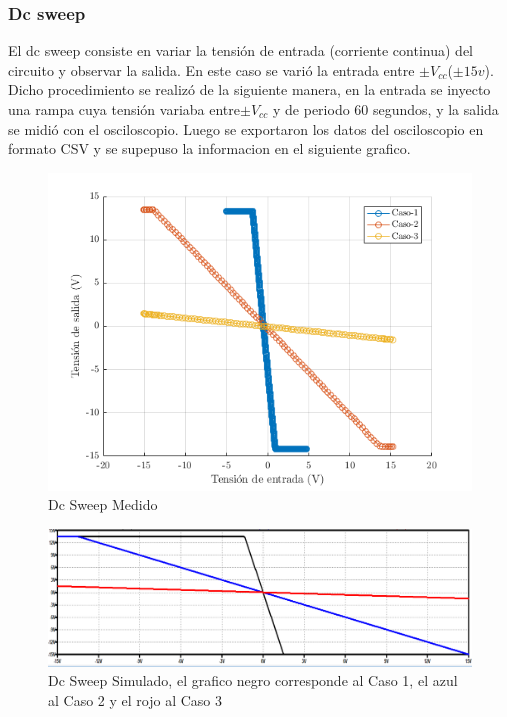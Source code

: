 \documentclass[../../main.tex]{subfiles}
\begin{document}
\subsubsection{Dc sweep}
El dc sweep consiste en variar la tensión de entrada (corriente continua) del circuito y observar la salida. En este caso se varió la entrada entre $\pm V_{cc}$($\pm 15 v$). Dicho procedimiento se realizó de la siguiente manera, en la entrada se inyecto una rampa  cuya  tensión variaba entre$\pm V_{cc}$ y de periodo 60 segundos, y la salida se midió con el osciloscopio. Luego se exportaron los datos del osciloscopio en formato CSV y se supepuso la informacion en el siguiente grafico.

\begin{figure}[H]
\centering
\includegraphics[width=1\textwidth]{dc_sweep_inv}
\caption{Dc Sweep Medido} \label{fig=dcInv}
\end{figure}

\begin{figure}[H]
\centering
\includegraphics[width=1.1\textwidth]{dc_sweep_inv_sim}
\caption{Dc Sweep Simulado, el grafico negro corresponde al Caso 1, el azul al Caso 2 y el rojo al Caso 3} \label{fig=dcInvSim}
\end{figure}
\end{document}
